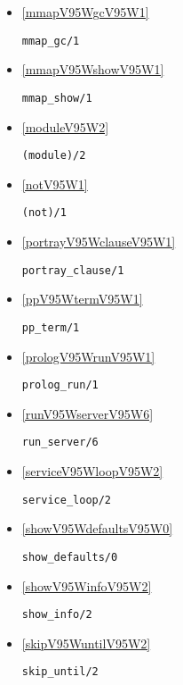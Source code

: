 \begin{itemize}
\item \ref{mmapV95WgcV95W1} 
\begin{verbatim}
mmap_gc/1
\end{verbatim}

\item \ref{mmapV95WshowV95W1} 
\begin{verbatim}
mmap_show/1
\end{verbatim}

\item \ref{moduleV95W2} 
\begin{verbatim}
(module)/2
\end{verbatim}

\item \ref{notV95W1} 
\begin{verbatim}
(not)/1
\end{verbatim}

\item \ref{portrayV95WclauseV95W1} 
\begin{verbatim}
portray_clause/1
\end{verbatim}

\item \ref{ppV95WtermV95W1} 
\begin{verbatim}
pp_term/1
\end{verbatim}

\item \ref{prologV95WrunV95W1} 
\begin{verbatim}
prolog_run/1
\end{verbatim}

\item \ref{runV95WserverV95W6} 
\begin{verbatim}
run_server/6
\end{verbatim}

\item \ref{serviceV95WloopV95W2} 
\begin{verbatim}
service_loop/2
\end{verbatim}

\item \ref{showV95WdefaultsV95W0} 
\begin{verbatim}
show_defaults/0
\end{verbatim}

\item \ref{showV95WinfoV95W2} 
\begin{verbatim}
show_info/2
\end{verbatim}

\item \ref{skipV95WuntilV95W2} 
\begin{verbatim}
skip_until/2
\end{verbatim}


\end{itemize}
